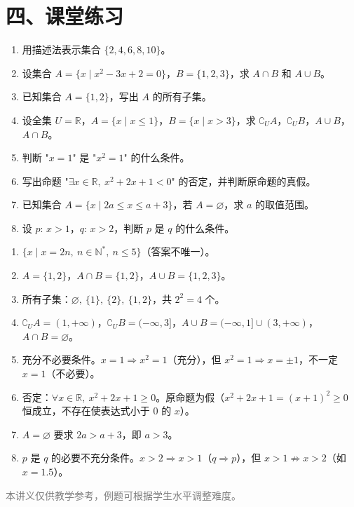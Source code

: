 \documentclass[12pt, a4paper]{ctexart}
\begin{document}
\section*{\textcolor{tipgreen}{四、课堂练习}}

\begin{enumerate}[label=\textbf{\arabic*.}, leftmargin=2em]
  \item 用描述法表示集合 $\{2, 4, 6, 8, 10\}$。

  \item 设集合 $A = \{x \mid x^2 - 3x + 2 = 0\}$，$B = \{1, 2, 3\}$，求 $A \cap B$ 和 $A \cup B$。

  \item 已知集合 $A = \{1, 2\}$，写出 $A$ 的所有子集。

  \item 设全集 $U = \mathbb{R}$，$A = \{x \mid x \leq 1\}$，$B = \{x \mid x > 3\}$，求 $\complement_U A$，$\complement_U B$，$A \cup B$，$A \cap B$。

  \item 判断 "$x = 1$" 是 "$x^2 = 1$" 的什么条件。

  \item 写出命题 "$\exists x \in \mathbb{R},\ x^2 + 2x + 1 < 0$" 的否定，并判断原命题的真假。

  \item 已知集合 $A = \{x \mid 2a \leq x \leq a + 3\}$，若 $A = \varnothing$，求 $a$ 的取值范围。

  \item 设 $p$: $x > 1$，$q$: $x > 2$，判断 $p$ 是 $q$ 的什么条件。
\end{enumerate}

\vspace{1em}
\begin{knowledgebox}[参考答案]
\begin{enumerate}[label=\textbf{\arabic*.}, leftmargin=2em]
  \item $\{x \mid x = 2n,\ n \in \mathbb{N}^*,\ n \leq 5\}$（答案不唯一）。
  \item $A = \{1, 2\}$，$A \cap B = \{1, 2\}$，$A \cup B = \{1, 2, 3\}$。
  \item 所有子集：$\varnothing,\ \{1\},\ \{2\},\ \{1,2\}$，共 $2^2 = 4$ 个。
  \item $\complement_U A = (1, +\infty)$，$\complement_U B = (-\infty, 3]$，$A \cup B = (-\infty, 1] \cup (3, +\infty)$，$A \cap B = \varnothing$。
  \item 充分不必要条件。$x = 1 \Rightarrow x^2 = 1$（充分），但 $x^2 = 1 \Rightarrow x = \pm 1$，不一定 $x = 1$（不必要）。
  \item 否定：$\forall x \in \mathbb{R},\ x^2 + 2x + 1 \geq 0$。原命题为假（$x^2 + 2x + 1 = (x+1)^2 \geq 0$ 恒成立，不存在使表达式小于 $0$ 的 $x$）。
  \item $A = \varnothing$ 要求 $2a > a + 3$，即 $a > 3$。
  \item $p$ 是 $q$ 的必要不充分条件。$x > 2 \Rightarrow x > 1$（$q \Rightarrow p$），但 $x > 1 \not\Rightarrow x > 2$（如 $x = 1.5$）。
\end{enumerate}
\end{knowledgebox}

\vfill
\begin{center}
\small\textcolor{gray}{本讲义仅供教学参考，例题可根据学生水平调整难度。}
\end{center}
\end{document}
